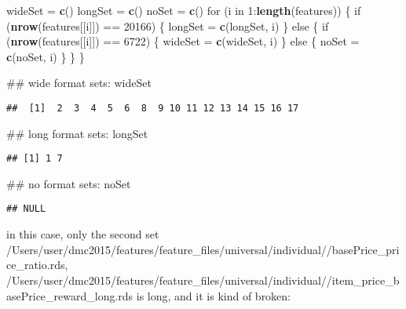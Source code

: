 \documentclass[10pt]{report}
\newenvironment{Shaded}{}{}
\newcommand{\KeywordTok}[1]{\textcolor[rgb]{0.00,0.44,0.13}{\textbf{{#1}}}}
\newcommand{\DecValTok}[1]{\textcolor[rgb]{0.25,0.63,0.44}{{#1}}}
\newcommand{\StringTok}[1]{\textcolor[rgb]{0.25,0.44,0.63}{{#1}}}
\newcommand{\NormalTok}[1]{{#1}}
\begin{document}
\begin{Shaded}
\begin{Highlighting}[]
\NormalTok{wideSet =}\StringTok{ }\KeywordTok{c}\NormalTok{()}
\NormalTok{longSet =}\StringTok{ }\KeywordTok{c}\NormalTok{()}
\NormalTok{noSet =}\StringTok{ }\KeywordTok{c}\NormalTok{()}
\NormalTok{for (i in }\DecValTok{1}\NormalTok{:}\KeywordTok{length}\NormalTok{(features)) \{}
    \NormalTok{if (}\KeywordTok{nrow}\NormalTok{(features[[i]]) ==}\StringTok{ }\DecValTok{20166}\NormalTok{) \{}
        \NormalTok{longSet =}\StringTok{ }\KeywordTok{c}\NormalTok{(longSet, i)}
    \NormalTok{\} else \{}
        \NormalTok{if (}\KeywordTok{nrow}\NormalTok{(features[[i]]) ==}\StringTok{ }\DecValTok{6722}\NormalTok{) \{}
            \NormalTok{wideSet =}\StringTok{ }\KeywordTok{c}\NormalTok{(wideSet, i)}
        \NormalTok{\} else \{}
            \NormalTok{noSet =}\StringTok{ }\KeywordTok{c}\NormalTok{(noSet, i)}
        \NormalTok{\}}
    \NormalTok{\}}
\NormalTok{\}}

\NormalTok{## wide format sets:}
\NormalTok{wideSet}
\end{Highlighting}
\end{Shaded}

\begin{verbatim}
##  [1]  2  3  4  5  6  8  9 10 11 12 13 14 15 16 17
\end{verbatim}

\begin{Shaded}
\begin{Highlighting}[]
\NormalTok{## long format sets:}
\NormalTok{longSet}
\end{Highlighting}
\end{Shaded}

\begin{verbatim}
## [1] 1 7
\end{verbatim}

\begin{Shaded}
\begin{Highlighting}[]
\NormalTok{## no format sets:}
\NormalTok{noSet}
\end{Highlighting}
\end{Shaded}

\begin{verbatim}
## NULL
\end{verbatim}

in this case, only the second set
/Users/user/dmc2015/features/feature\_files/universal/individual//basePrice\_price\_ratio.rds,
/Users/user/dmc2015/features/feature\_files/universal/individual//item\_price\_basePrice\_reward\_long.rds
is long, and it is kind of broken:
\end{document}

